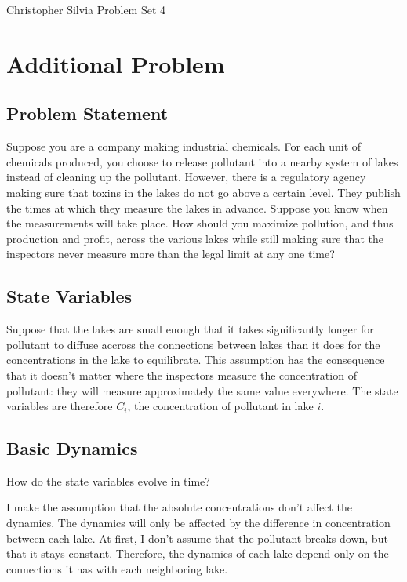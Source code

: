 \documentclass{article}
\begin{document}
\begin{flushright}
	Christopher Silvia
	Problem Set 4
\end{flushright}

\section{Additional Problem}

\subsection{Problem Statement}

Suppose you are a company making industrial chemicals.
For each unit of chemicals produced, you choose to release
	pollutant into a nearby system of lakes instead
	of cleaning up the pollutant.
However, there is a regulatory agency making sure that
	toxins in the lakes do not go above a certain level.
They publish the times at which they measure the lakes in advance.
Suppose you know when the measurements will take place.
How should you maximize pollution, and thus production and profit,
	across the various lakes while still making sure that the 
	inspectors never measure more than the legal limit
	at any one time?

\subsection{State Variables}

Suppose that the lakes are small enough that it takes significantly
	longer for pollutant to diffuse accross the connections
	between lakes than it does for the concentrations in the lake
	to equilibrate.
This assumption has the consequence that it doesn't matter where the
	inspectors measure the concentration of pollutant:
	they will measure approximately the same value everywhere.
The state variables are therefore $C_i$, the concentration of 
	pollutant in lake $i$.

\subsection{Basic Dynamics}

How do the state variables evolve in time?

I make the assumption that the absolute concentrations don't affect
	the dynamics.
The dynamics will only be affected by the difference in concentration
	between each lake.
At first, I don't assume that the pollutant breaks down, but that
	it stays constant.
Therefore, the dynamics of each lake depend only on the connections
	it has with each neighboring lake.
\end{document}
